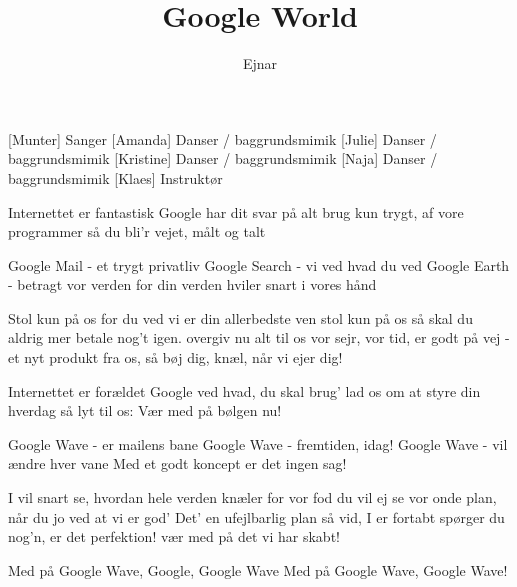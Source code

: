 \documentclass[a4paper,11pt]{article}
\title{Google World}
\author{Ejnar}
\begin{document}
\maketitle

\begin{roles}
[Munter] Sanger
[Amanda] Danser / baggrundsmimik
[Julie] Danser / baggrundsmimik
[Kristine] Danser / baggrundsmimik
[Naja] Danser / baggrundsmimik
[Klaes] Instruktør
\end{roles}
 
\begin{song}

 Internettet er fantastisk
Google har dit svar på alt
brug kun trygt, af vore programmer
så du bli'r vejet, målt og talt

 Google Mail - et trygt privatliv
Google Search - vi ved hvad du ved
Google Earth - betragt vor verden
for din verden hviler snart i vores hånd

 Stol kun på os
for du ved vi er din allerbedste ven
stol kun på os
så skal du aldrig mer betale nog't igen.
overgiv nu alt til os
vor sejr, vor tid, er godt på vej
- et nyt produkt fra os,
så bøj dig, knæl, når vi ejer dig!

 Internettet er forældet
Google ved hvad, du skal brug'
lad os om at styre din hverdag
så lyt til os: Vær med på bølgen nu!

 Google Wave - er mailens bane
Google Wave - fremtiden, idag!
Google Wave - vil ændre hver vane
Med et godt koncept er det ingen sag!

 I vil snart se,
hvordan hele verden knæler for vor fod
du vil ej se
vor onde plan, når du jo ved at vi er god'
Det' en ufejlbarlig plan
så vid, I er fortabt
spørger du nog'n, er det perfektion!
vær med på det vi har skabt!

 Med på Google Wave, Google, Google Wave
Med på Google Wave, Google Wave!

\end{song}
\end{document}
